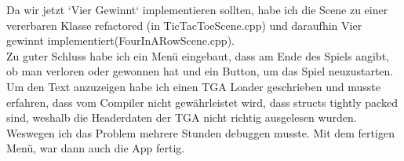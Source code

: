 Da wir jetzt `Vier Gewinnt` implementieren sollten, habe ich die Scene zu einer vererbaren Klasse refactored (in TicTacToeScene.cpp) und daraufhin Vier gewinnt implementiert(FourInARowScene.cpp). \\

Zu guter Schluss habe ich ein Menü eingebaut, dass am Ende des Spiels angibt, ob man
verloren oder gewonnen hat und ein Button, um das Spiel neuzustarten.
Um den Text anzuzeigen habe ich einen TGA Loader geschrieben und musste
erfahren, dass vom Compiler nicht gewährleistet wird, dass structs tightly packed
sind, weshalb die Headerdaten der TGA nicht richtig ausgelesen wurden. Weswegen ich das Problem mehrere Stunden debuggen musste. Mit dem fertigen Menü, war dann auch die App fertig.
